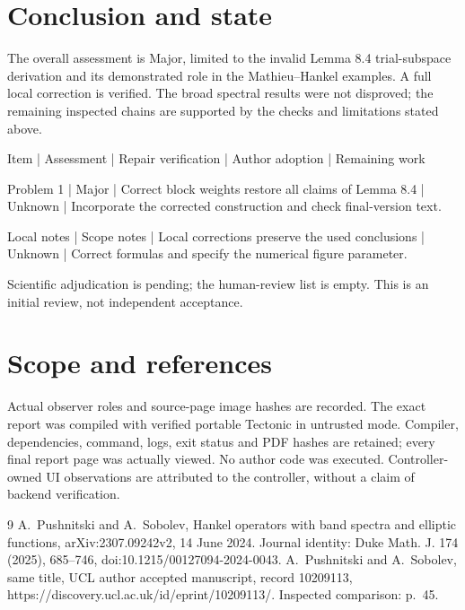 \documentclass[10pt]{article}
\begin{document}
\section*{Conclusion and state}
The overall assessment is Major, limited to the invalid Lemma 8.4 trial-subspace derivation and its demonstrated role in the Mathieu–Hankel examples. A full local correction is verified. The broad spectral results were not disproved; the remaining inspected chains are supported by the checks and limitations stated above.\par
Item | Assessment | Repair verification | Author adoption | Remaining work\par
Problem 1 | Major | Correct block weights restore all claims of Lemma 8.4 | Unknown | Incorporate the corrected construction and check final-version text.\par
Local notes | Scope notes | Local corrections preserve the used conclusions | Unknown | Correct formulas and specify the numerical figure parameter.\par
Scientific adjudication is pending; the human-review list is empty. This is an initial review, not independent acceptance.\par
\section*{Scope and references}
Actual observer roles and source-page image hashes are recorded. The exact report was compiled with verified portable Tectonic in untrusted mode. Compiler, dependencies, command, logs, exit status and PDF hashes are retained; every final report page was actually viewed. No author code was executed. Controller-owned UI observations are attributed to the controller, without a claim of backend verification.\par
9 A. Pushnitski and A. Sobolev, Hankel operators with band spectra and elliptic functions, arXiv:2307.09242v2, 14 June 2024. Journal identity: Duke Math. J. 174 (2025), 685–746, doi:10.1215/00127094-2024-0043. A. Pushnitski and A. Sobolev, same title, UCL author accepted manuscript, record 10209113, https://discovery.ucl.ac.uk/id/eprint/10209113/. Inspected comparison: p. 45.\par
\end{document}
